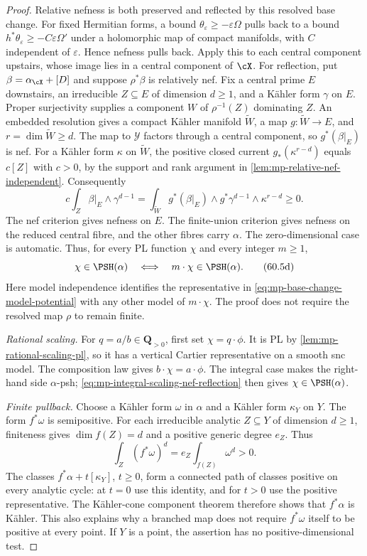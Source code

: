 \begin{proof}
Relative nefness is both preserved and reflected by this resolved base
change. For fixed Hermitian forms, a bound
$\theta_\varepsilon\geq-\varepsilon\Omega$ pulls back to a
bound $h^*\theta_\varepsilon\geq-C\varepsilon\Omega'$
under a holomorphic map of compact manifolds, with $C$ independent
of $\varepsilon$. Hence nefness pulls back. Apply this to each
central component upstairs, whose image lies in a central component
of $\cX$.
For reflection, put $\beta=\alpha_{\cX}+[D]$ and suppose
$\rho^*\beta$ is relatively nef. Fix a central prime $E$ downstairs,
an irreducible $Z\subseteq E$ of dimension $d\geq1$, and a
K\"ahler form $\gamma$ on $E$. Proper surjectivity supplies a
component $W$ of $\rho^{-1}(Z)$ dominating $Z$.
An embedded resolution gives a compact K\"ahler manifold
$\widetilde W$, a map $g:\widetilde W\to E$, and
$r=\dim\widetilde W\geq d$.
The map to $\mathcal Y$ factors through a central component,
so $g^*(\beta|_E)$ is nef. For a K\"ahler form $\kappa$ on
$\widetilde W$, the positive closed current
$g_*(\kappa^{r-d})$ equals $c[Z]$ with $c>0$, by the support
and rank argument in \cref{lem:mp-relative-nef-independent}.
Consequently
\[
 c\int_Z\beta|_E\wedge\gamma^{d-1}
   =\int_{\widetilde W}g^*(\beta|_E)
           \wedge g^*\gamma^{d-1}\wedge\kappa^{r-d}\geq0.
\]
The nef criterion \cite[Theorem~4.3(iii), p.~1267]{DP04}
gives nefness on $E$. The finite-union criterion gives nefness on
the reduced central fibre, and the other fibres carry $\alpha$.
The zero-dimensional case is automatic. Thus, for every PL function
$\chi$ and every integer $m\geq1$,
\[
 \chi\in\PSH(\alpha)
       \quad\Longleftrightarrow\quad
 m\cdot\chi\in\PSH(\alpha).
\tag{60.5d}\label{eq:mp-integral-scaling-nef-reflection}
\]
Here model independence identifies the representative in
\eqref{eq:mp-base-change-model-potential} with any other model of
$m\cdot\chi$. The proof does not require the resolved map $\rho$
to remain finite.

\emph{Rational scaling.}
For $q=a/b\in\mathbf Q_{>0}$, first set $\chi=q\cdot\phi$.
It is PL by \cref{lem:mp-rational-scaling-pl}, so it has a
vertical Cartier representative on a smooth snc model.
The composition law gives $b\cdot\chi=a\cdot\phi$.
The integral case makes the right-hand side $\alpha$-psh;
\eqref{eq:mp-integral-scaling-nef-reflection} then gives
$\chi\in\PSH(\alpha)$.

\emph{Finite pullback.}
Choose a K\"ahler form $\omega$ in $\alpha$ and a K\"ahler
form $\kappa_Y$ on $Y$. The form $f^*\omega$ is semipositive.
For each irreducible analytic $Z\subseteq Y$ of dimension $d\geq1$,
finiteness gives $\dim f(Z)=d$ and a positive generic degree $e_Z$.
Thus
\[
            \int_Z(f^*\omega)^d
                 =e_Z\int_{f(Z)}\omega^d>0.
\]
The classes $f^*\alpha+t[\kappa_Y]$, $t\geq0$, form a connected
path of classes positive on every analytic cycle: at $t=0$ use this
identity, and for $t>0$ use the positive representative.
The K\"ahler-cone component theorem
\cite[Theorem~0.1, p.~1248]{DP04} therefore shows that
$f^*\alpha$ is K\"ahler. This also explains why a branched map
does not require $f^*\omega$ itself to be positive at every point.
If $Y$ is a point, the assertion has no positive-dimensional test.


\end{proof}
